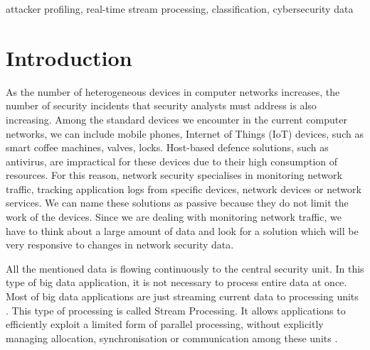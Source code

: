 \documentclass[conference, a4paper]{IEEEtran}
\begin{document}
\begin{IEEEkeywords}
attacker profiling, real-time stream processing, classification, cybersecurity data
\end{IEEEkeywords}

\section{Introduction}
As the number of heterogeneous devices in computer networks increases, the number of security incidents that security analysts must address is also increasing. Among the standard devices we encounter in the current computer networks, we can include mobile phones, Internet of Things (IoT) devices, such as smart coffee machines, valves, locks. Host-based defence solutions, such as antivirus, are impractical for these devices due to their high consumption of resources. For this reason, network security specialises in monitoring network traffic, tracking application logs from specific devices, network devices or network services. We can name these solutions as passive because they do not limit the work of the devices. Since we are dealing with monitoring network traffic, we have to think about a large amount of data and look for a solution which will be very responsive to changes in network security data. 

All the mentioned data is flowing continuously to the central security unit. In this type of big data application, it is not necessary to process entire data at once. Most of big data applications are just streaming current data to processing units \cite{mizell2017introduction}. This type of processing is called Stream Processing. It allows applications to efficiently exploit a limited form of parallel processing, without explicitly managing allocation, synchronisation or communication among these units \cite{cugola2012processing}.
\end{document}
